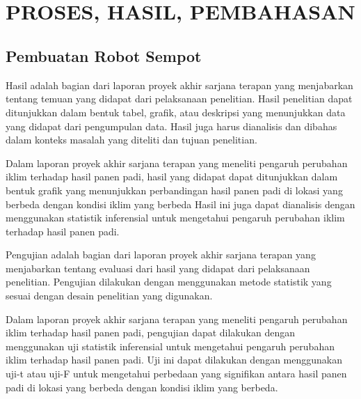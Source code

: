 
\chapter[PROSES, HASIL, PEMBAHASAN]{\\ PROSES, HASIL, PEMBAHASAN}

\section{Pembuatan Robot Sempot}
Hasil adalah bagian dari laporan proyek akhir sarjana terapan yang menjabarkan tentang temuan yang didapat dari pelaksanaan penelitian. Hasil penelitian dapat ditunjukkan dalam bentuk tabel, grafik, atau deskripsi yang menunjukkan data yang didapat dari pengumpulan data. Hasil juga harus dianalisis dan dibahas dalam konteks masalah yang diteliti dan tujuan penelitian.

Dalam laporan proyek akhir sarjana terapan yang meneliti pengaruh perubahan iklim terhadap hasil panen padi, hasil yang didapat dapat ditunjukkan dalam bentuk grafik yang menunjukkan perbandingan hasil panen padi di lokasi yang berbeda dengan kondisi iklim yang berbeda Hasil ini juga dapat dianalisis dengan menggunakan statistik inferensial untuk mengetahui pengaruh perubahan iklim terhadap hasil panen padi.

Pengujian adalah bagian dari laporan proyek akhir sarjana terapan yang menjabarkan tentang evaluasi dari hasil yang didapat dari pelaksanaan penelitian. Pengujian dilakukan dengan menggunakan metode statistik yang sesuai dengan desain penelitian yang digunakan.

Dalam laporan proyek akhir sarjana terapan yang meneliti pengaruh perubahan iklim terhadap hasil panen padi, pengujian dapat dilakukan dengan menggunakan uji statistik inferensial untuk mengetahui pengaruh perubahan iklim terhadap hasil panen padi. Uji ini dapat dilakukan dengan menggunakan uji-t atau uji-F untuk mengetahui perbedaan yang signifikan antara hasil panen padi di lokasi yang berbeda dengan kondisi iklim yang berbeda.

